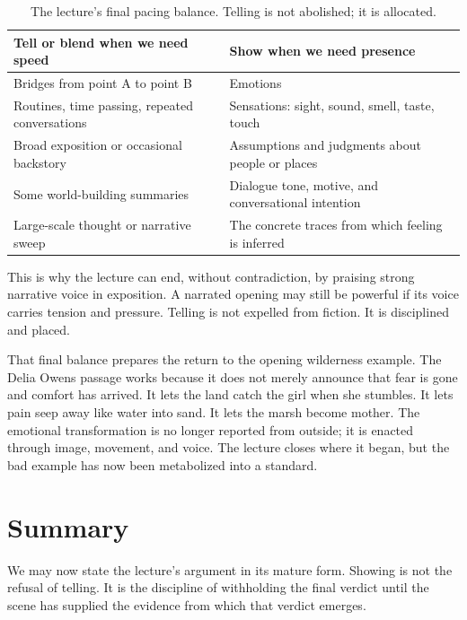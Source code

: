 \begin{table}[h]
\centering
\begin{tabular}{|p{}|p{}|}
\hline
\textbf{Tell or blend when we need speed} & \textbf{Show when we need presence} \\
\hline
Bridges from point A to point B & Emotions \\
\hline
Routines, time passing, repeated conversations & Sensations: sight, sound, smell, taste, touch \\
\hline
Broad exposition or occasional backstory & Assumptions and judgments about people or places \\
\hline
Some world-building summaries & Dialogue tone, motive, and conversational intention \\
\hline
Large-scale thought or narrative sweep & The concrete traces from which feeling is inferred \\
\hline
\end{tabular}
\caption{The lecture's final pacing balance. Telling is not abolished; it is allocated.}
\end{table}

This is why the lecture can end, without contradiction, by praising strong narrative voice in exposition. A narrated opening may still be powerful if its voice carries tension and pressure. Telling is not expelled from fiction. It is disciplined and placed.

That final balance prepares the return to the opening wilderness example. The Delia Owens passage works because it does not merely announce that fear is gone and comfort has arrived. It lets the land catch the girl when she stumbles. It lets pain seep away like water into sand. It lets the marsh become mother. The emotional transformation is no longer reported from outside; it is enacted through image, movement, and voice. The lecture closes where it began, but the bad example has now been metabolized into a standard.

\section{Summary}

We may now state the lecture's argument in its mature form. Showing is not the refusal of telling. It is the discipline of withholding the final verdict until the scene has supplied the evidence from which that verdict emerges.

